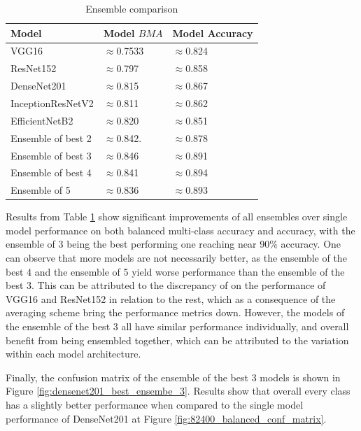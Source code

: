     \begin{table}[h]
        \centering
        \begin{tabularx}{\textwidth}{|l|X|X|}
            \hline
            Model & Model $BMA$ & Model Accuracy \\ \hline
            VGG16 & $\approx$0.7533 & $\approx$0.824 \\ \hline
            ResNet152 & $\approx$0.797 & $\approx$0.858 \\ \hline
            DenseNet201 & $\approx$0.815 & $\approx$0.867 \\ \hline
            InceptionResNetV2 & $\approx$0.811 & $\approx$0.862 \\ \hline
            EfficientNetB2 & $\approx$0.820 & $\approx$0.851 \\ \hline
            Ensemble of best 2 & $\approx$0.842. & $\approx$0.878 \\ \hline
            Ensemble of best 3 & $\approx$0.846 & $\approx$0.891 \\ \hline
            Ensemble of best 4 & $\approx$0.841 & $\approx$0.894 \\ \hline
            Ensemble of 5 & $\approx$0.836 & $\approx$0.893  \\ \hline
        \end{tabularx}
        \caption{Ensemble comparison}
        \label{tables:82400_ensemble}
    \end{table} 

    Results from Table \ref{tables:82400_ensemble} show significant improvements of all ensembles over single model performance on both balanced multi-class accuracy and accuracy, with the ensemble of 3 being the best performing one reaching near 90\% accuracy. One can observe that more models are not necessarily better, as the ensemble of the best 4 and the ensemble of 5 yield worse performance than the ensemble of the best 3. This can be attributed to the discrepancy of on the performance of VGG16 and ResNet152 in relation to the rest, which as a consequence of the averaging scheme bring the performance metrics down. However, the models of the ensemble of the best 3 all have similar performance individually, and overall benefit from being ensembled together, which can be attributed to the variation within each model architecture. \par
    
    Finally, the confusion matrix of the ensemble of the best 3 models is shown in Figure \ref{fig:densenet201_best_ensembe_3}. Results show that overall every class has a slightly better performance when compared to the single model performance of DenseNet201 at Figure \ref{fig:82400_balanced_conf_matrix}. \par
    
